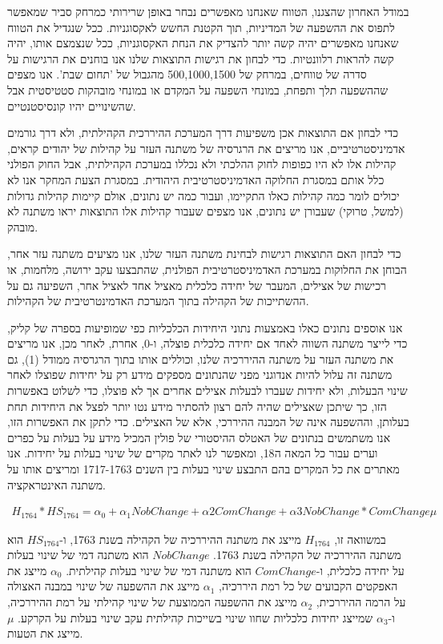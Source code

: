 במודל האחרון שהצגנו, הטווח שאנחנו מאפשרים נבחר באופן שרירותי כמרחק סביר שמאפשר לתפוס את ההשפעה של המדיניות, תוך הקטנת החשש לאקסוגניות. ככל שנגדיל את הטווח שאנחנו מאפשרים יהיה קשה יותר להצדיק את הנחת האקסוגניות, ככל שנצמצם אותו, יהיה קשה להראות רלוונטיות. כדי לבחון את רגישות התוצאות שלנו אנו בוחנים את הרגישות על סדרה של טווחים, במרחק של 500,1000,1500 מהגבול של 'תחום שבת'. אנו מצפים שההשפעה תלך ותפחת, במונחי השפעה על המקדם או במונחי מובהקות סטטיסטית אבל שהשינויים יהיו קונסיסטנטיים. 

כדי לבחון אם התוצאות אכן משפיעות דרך המערכת ההיררכית הקהילתית, ולא דרך גורמים אדמיניסטרטיביים, אנו מריצים את הרגרסיה של משתנה העזר על קהילות של יהודים קראים, קהילות אלו לא היו כפופות לחוק ההלכתי ולא נכללו במערכת הקהילתית, אבל החוק הפולני כלל אותם במסגרת החלוקה האדמיניסטרטיבית היהודית. במסגרת הצעת המחקר אנו לא יכולים לומר כמה קהילות כאלו התקיימו, ועבור כמה יש נתונים, אולם קיימות קהילות גדולות (למשל, טרוקי) שעבורן יש נתונים, אנו מצפים שעבור קהילות אלו התוצאות יראו משתנה לא מובהק.

כדי לבחון האם התוצאות רגישות לבחינת משתנה העזר שלנו, אנו מציעים משתנה עזר אחר, הבוחן את החלוקות במערכת האדמיניסטרטיבית הפולנית, שהתבצעו עקב ירושה, מלחמות, או רכישות של אצילים, המעבר של יחידה כלכלית מאציל אחד לאציל אחר, השפיעה גם על ההשתייכות של הקהילה בתוך המערכת האדמינטרטיבית של הקהילות. 

אנו אוספים נתונים כאלו באמצעות נתוני היחידות הכלכליות כפי שמופיעות בספרה של קליק, כדי לייצר משתנה השווה לאחד אם יחידה כלכלית פוצלה, ו-0, אחרת, לאחר מכן, אנו מריצים את משתנה העזר על משתנה ההיררכיה שלנו, וכוללים אותו בתוך הרגרסיה ממודל (1), גם משתנה זה עלול להיות אנדוגני מפני שהנתונים מספקים מידע רק על יחידות שפוצלו לאחר שינוי הבעלות, ולא יחידות שעברו לבעלות אצילים אחרים אך לא פוצלו, כדי לשלוט באפשרות הזו, כך שיתכן שאצילים שהיה להם רצון להסתיר מידע נטו יותר לפצל את היחידות תחת בעלותן, וההשפעה אינה של המבנה ההיררכי, אלא של האצילים. כדי לתקן את האפשרות הזו, אנו משתמשים בנתונים של האטלס ההיסטורי של פולין המכיל מידע על בעלות על כפרים וערים עבור כל המאה ה18, ומאפשר לנו לאתר מקרים של שינוי בעלות על יחידות. אנו מאתרים את כל המקרים בהם התבצע שינוי בעלות בין השנים 1717-1763 ומריצים אותו על משתנה האינטראקציה.

\begin{align}
H_{1764}*HS_{1764}= \alpha_0 + \alpha_1 NobChange +\alpha2 ComChange +\alpha3 NobChange * ComChange\mu
\end{align}
	

במשוואה זו, $H_{1764}$ מייצג את משתנה ההיררכיה של הקהילה בשנת 1763, ו-$HS_{1764}$ הוא משתנה ההיררכיה של הקהילה בשנת 1763. $NobChange$ הוא משתנה דמי של שינוי בעלות על יחידה כלכלית, ו-$ComChange$ הוא משתנה דמי של שינוי בעלות קהילתית. $\alpha_0$ מייצג את האפקטים הקבועים של כל רמת היררכיה, $\alpha_1$ מייצג את ההשפעה של שינוי במבנה האצולה על הרמה ההיררכית, $\alpha_2$ מייצג את ההשפעה הממוצעת של שינוי קהילתי על רמת ההיררכיה, ו-$\alpha_3$  שמייצג יחידות כלכליות שחוו שינוי בשייכות קהילתית עקב שינוי בעלות על הקרקע. $\mu$ מייצג את הטעות.

